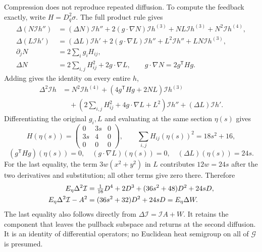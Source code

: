 Compression does not reproduce repeated diffusion. To compute the
feedback exactly, write $H=D_q^2\sigma$. The full product rule gives
\begin{align*}
 \Delta(N\mathcal I h'')&=(\Delta N)\mathcal I h''+
 2(g\cdot\nabla N)\mathcal I h^{(3)}+NL\mathcal I h^{(3)}+N^2\mathcal I h^{(4)},\\
 \Delta(L\mathcal I h')&=(\Delta L)\mathcal I h'+
 2(g\cdot\nabla L)\mathcal I h''+L^2\mathcal I h''+LN\mathcal I h^{(3)},\\
 \partial_jN&=2\sum_i g_iH_{ij},\\
 \Delta N&=2\sum_{i,j}H_{ij}^2+2g\cdot\nabla L,\qquad
 g\cdot\nabla N=2g^{\mathsf T}Hg.
\end{align*}
Adding gives the identity on every entire $h$,
\begin{align*}
 \Delta^2\mathcal I h
 &=N^2\mathcal I h^{(4)}
 +(4g^{\mathsf T}Hg+2NL)\mathcal I h^{(3)}\\
 &\quad+(2\sum_{i,j}H_{ij}^2+4g\cdot\nabla L+L^2)\mathcal I h''
 +(\Delta L)\mathcal I h'.
\end{align*}
Differentiating the original $g_i,L$ and evaluating at the same section
$\eta(s)$ gives
\[
 H(\eta(s))=
 \begin{pmatrix}0&3s&0\\3s&4&0\\0&0&0\end{pmatrix},\qquad
 \sum_{i,j}H_{ij}(\eta(s))^2=18s^2+16,
\]
\[
 (g^{\mathsf T}Hg)(\eta(s))=0,\quad
 (g\cdot\nabla L)(\eta(s))=0,\quad
 (\Delta L)(\eta(s))=24s .
\]
For the last equality, the term $3w(x^2+y^2)$ in $L$ contributes
$12w=24s$ after the two derivatives and substitution; all other terms
give zero there. Therefore
\begin{align}
 E_\eta\Delta^2\mathcal I 
 &=\tfrac1{16}D^4+2D^3+(36s^2+48)D^2+24sD,\notag\\
 E_\eta\Delta^2\mathcal I -A^2
 &=(36s^2+32)D^2+24sD=E_\eta\Delta W .
 \label{eq:cq-spatial-second-feedback}
\end{align}
The last equality also follows directly from $\Delta \mathcal I =\mathcal I A+W$.
It retains the component that leaves the pullback subspace and returns
at the second diffusion. It is an identity of differential operators;
no Euclidean heat semigroup on all of $\mathscr G$ is presumed.

